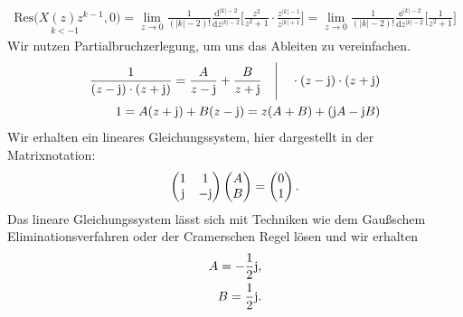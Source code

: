\begin{align}
	\underset{k<-1}{\mathrm{Res}(X(z)z^{k-1},0})=\lim\limits_{z\rightarrow0}\frac{1}{(|k|-2)!}\frac{\mathrm{d}^{|k|-2}}{\mathrm{d}z^{|k|-2}}\Bigg [\frac{z^2}{z^2+1} \cdot\frac{z^{|k|-1}}{z^{|k|+1}}\Bigg]=\lim\limits_{z\rightarrow0}\frac{1}{(|k|-2)!}\frac{\mathbb{d}^{|k|-2}}{\mathrm{d}z^{|k|-2}}\Bigg [\frac{1}{z^2+1}\Bigg]
\end{align}
Wir nutzen Partialbruchzerlegung, um uns das Ableiten zu vereinfachen.
\begin{align}
	\frac{1}{(z-\im)\cdot(z+\im)}=\frac{A}{z-\im}+\frac{B}{z+\im}\quad\Bigg | \quad \cdot(z-\im)\cdot(z+\im) \nonumber \\
	1=A(z+\im)+B(z-\im)=z(A+B)+(\im A -\im B)
\end{align}
Wir erhalten ein lineares Gleichungssystem, hier dargestellt in der Matrixnotation:
\begin{align}
	\begin{pmatrix}
		1 & 1 \\
		\im & -\im
	\end{pmatrix}
	\begin{pmatrix}
		A \\
		B
	\end{pmatrix}
	=
	\begin{pmatrix}
		0 \\
		1
	\end{pmatrix}.
\end{align}
Das lineare Gleichungssystem lässt sich mit Techniken wie dem Gaußschem Eliminationsverfahren oder der Cramerschen Regel lösen und wir erhalten
\begin{align}
	A= -\frac{1}{2}\im, \nonumber \\
	B = \frac{1}{2}\im.
\end{align}
